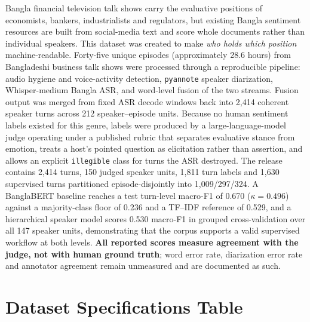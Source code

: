 \documentclass[11pt,a4paper]{article}
\begin{document}
Bangla financial television talk shows carry the evaluative positions of economists, bankers,
industrialists and regulators, but existing Bangla sentiment resources are built from
social-media text and score whole documents rather than individual speakers. This dataset was
created to make \emph{who holds which position} machine-readable. Forty-five unique episodes
(approximately 28.6 hours) from Bangladeshi business talk shows were processed through a
reproducible pipeline: audio hygiene and voice-activity detection, \texttt{pyannote} speaker
diarization, Whisper-medium Bangla ASR, and word-level fusion of the two streams. Fusion output
was merged from fixed ASR decode windows back into 2{,}414 coherent speaker turns across 212
speaker--episode units. Because no human sentiment labels existed for this genre, labels were
produced by a large-language-model judge operating under a published rubric that separates
evaluative stance from emotion, treats a host's pointed question as elicitation rather than
assertion, and allows an explicit \texttt{illegible} class for turns the ASR destroyed. The
release contains 2{,}414 turns, 150 judged speaker units, 1{,}811 turn labels and 1{,}630
supervised turns partitioned episode-disjointly into 1{,}009/297/324. A BanglaBERT baseline reaches
a test turn-level macro-F1 of 0.670 ($\kappa=0.496$) against a majority-class floor of 0.236 and a
TF--IDF reference of 0.529, and a hierarchical speaker model scores 0.530 macro-F1 in grouped
cross-validation over all 147 speaker units, demonstrating that the corpus supports a valid
supervised workflow at both levels. \textbf{All reported scores measure
agreement with the judge, not with human ground truth}; word error rate, diarization error rate
and annotator agreement remain unmeasured and are documented as such.

\section{Dataset Specifications Table}
\end{document}
